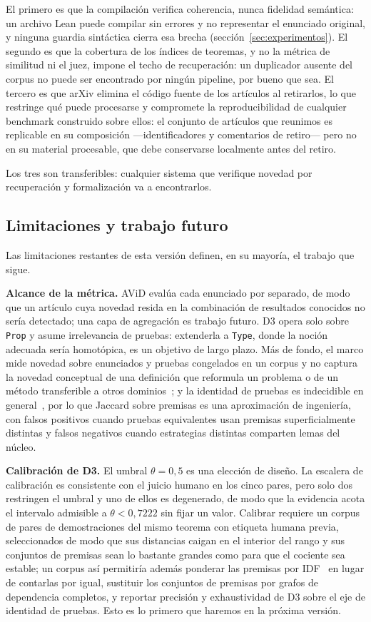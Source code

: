 \documentclass[12pt,a4paper]{article}
\theoremstyle{remark}
\begin{document}
El primero es que la compilación verifica coherencia, nunca fidelidad semántica: un archivo Lean puede compilar sin errores y no representar el enunciado original, y ninguna guardia sintáctica cierra esa brecha (sección~\ref{sec:experimentos}). El segundo es que la cobertura de los índices de teoremas, y no la métrica de similitud ni el juez, impone el techo de recuperación: un duplicador ausente del corpus no puede ser encontrado por ningún pipeline, por bueno que sea. El tercero es que arXiv elimina el código fuente de los artículos al retirarlos, lo que restringe qué puede procesarse y compromete la reproducibilidad de cualquier benchmark construido sobre ellos: el conjunto de artículos que reunimos es replicable en su composición —identificadores y comentarios de retiro— pero no en su material procesable, que debe conservarse localmente antes del retiro.

Los tres son transferibles: cualquier sistema que verifique novedad por recuperación y formalización va a encontrarlos.

\subsection{Limitaciones y trabajo futuro}

Las limitaciones restantes de esta versión definen, en su mayoría, el trabajo que sigue.

\textbf{Alcance de la métrica.} AViD evalúa cada enunciado por separado, de modo que un artículo cuya novedad resida en la combinación de resultados conocidos no sería detectado; una capa de agregación es trabajo futuro. D3 opera solo sobre \texttt{Prop} y asume irrelevancia de pruebas: extenderla a \texttt{Type}, donde la noción adecuada sería homotópica, es un objetivo de largo plazo. Más de fondo, el marco mide novedad sobre enunciados y pruebas congelados en un corpus y no captura la novedad conceptual de una definición que reformula un problema o de un método transferible a otros dominios~\cite{lakatos1976}; y la identidad de pruebas es indecidible en general~\cite{dosen2003}, por lo que Jaccard sobre premisas es una aproximación de ingeniería, con falsos positivos cuando pruebas equivalentes usan premisas superficialmente distintas y falsos negativos cuando estrategias distintas comparten lemas del núcleo.

\textbf{Calibración de D3.} El umbral $\theta = 0{,}5$ es una elección de diseño. La escalera de calibración es consistente con el juicio humano en los cinco pares, pero solo dos restringen el umbral y uno de ellos es degenerado, de modo que la evidencia acota el intervalo admisible a $\theta < 0{,}7222$ sin fijar un valor. Calibrar requiere un corpus de pares de demostraciones del mismo teorema con etiqueta humana previa, seleccionados de modo que sus distancias caigan en el interior del rango y sus conjuntos de premisas sean lo bastante grandes como para que el cociente sea estable; un corpus así permitiría además ponderar las premisas por IDF~\cite{huch2022} en lugar de contarlas por igual, sustituir los conjuntos de premisas por grafos de dependencia completos, y reportar precisión y exhaustividad de D3 sobre el eje de identidad de pruebas. Esto es lo primero que haremos en la próxima versión.
\end{document}
